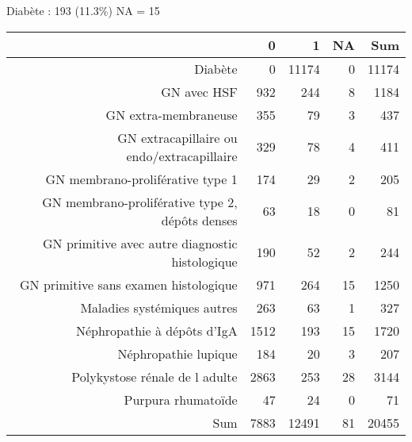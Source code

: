 \documentclass[11pt,a4paper]{article}\usepackage[]{graphicx}\usepackage[]{color}
\begin{document}
Diabète : 193 (11.3\%) NA = 15

\begin{table}[ht]
\centering
\begin{tabular}{rrrrr}
  \hline
 & 0 & 1 & NA & Sum \\ 
  \hline
Diabète & 0 & 11174 & 0 & 11174 \\ 
  GN avec HSF & 932 & 244 & 8 & 1184 \\ 
  GN extra-membraneuse & 355 & 79 & 3 & 437 \\ 
  GN extracapillaire ou endo/extracapillaire & 329 & 78 & 4 & 411 \\ 
  GN membrano-proliférative type 1 & 174 & 29 & 2 & 205 \\ 
  GN membrano-proliférative type 2, dépôts denses & 63 & 18 & 0 & 81 \\ 
  GN primitive avec autre diagnostic histologique & 190 & 52 & 2 & 244 \\ 
  GN primitive sans examen histologique & 971 & 264 & 15 & 1250 \\ 
  Maladies systémiques autres & 263 & 63 & 1 & 327 \\ 
  Néphropathie à dépôts d'IgA & 1512 & 193 & 15 & 1720 \\ 
  Néphropathie lupique & 184 & 20 & 3 & 207 \\ 
  Polykystose rénale de l adulte & 2863 & 253 & 28 & 3144 \\ 
  Purpura rhumatoïde & 47 & 24 & 0 & 71 \\ 
  Sum & 7883 & 12491 & 81 & 20455 \\ 
   \hline
\end{tabular}
\end{table}
\end{document}
